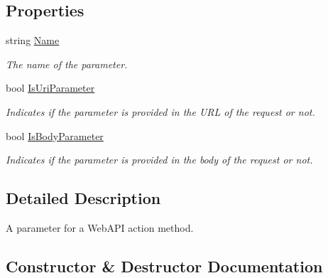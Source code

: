 \subsection*{Properties}
\begin{DoxyCompactItemize}
\item 
string \hyperlink{classCqrs_1_1WebApi_1_1Controllers_1_1ClientController_1_1ApiParameterModel_a0677b50dfb8a3f7b2379d1af3424c7e7_a0677b50dfb8a3f7b2379d1af3424c7e7}{Name}
\begin{DoxyCompactList}\small\item\em The name of the parameter. \end{DoxyCompactList}\item 
bool \hyperlink{classCqrs_1_1WebApi_1_1Controllers_1_1ClientController_1_1ApiParameterModel_a2c3f5b3bab3b0a77d49339496ba7c1c5_a2c3f5b3bab3b0a77d49339496ba7c1c5}{Is\+Uri\+Parameter}
\begin{DoxyCompactList}\small\item\em Indicates if the parameter is provided in the U\+RL of the request or not. \end{DoxyCompactList}\item 
bool \hyperlink{classCqrs_1_1WebApi_1_1Controllers_1_1ClientController_1_1ApiParameterModel_a1eda14fd918860c32db2a2ff168d6ad2_a1eda14fd918860c32db2a2ff168d6ad2}{Is\+Body\+Parameter}
\begin{DoxyCompactList}\small\item\em Indicates if the parameter is provided in the body of the request or not. \end{DoxyCompactList}\end{DoxyCompactItemize}


\subsection{Detailed Description}
A parameter for a Web\+A\+PI action method. 



\subsection{Constructor \& Destructor Documentation}
\mbox{\label{classCqrs_1_1WebApi_1_1Controllers_1_1ClientController_1_1ApiParameterModel_a10222cdb87160250e4722834d8ebda3b_a10222cdb87160250e4722834d8ebda3b}} 
